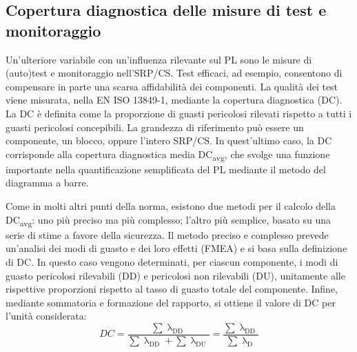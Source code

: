 \subsection{Copertura diagnostica delle misure di test e monitoraggio}
\label{subsec:06-2-14}
Un'ulteriore variabile con un'influenza rilevante sul PL sono le misure di (auto)test e monitoraggio nell'SRP/CS. Test efficaci, ad esempio, consentono di compensare in parte una scarsa affidabilità dei componenti. La qualità dei test viene misurata, nella EN ISO 13849-1, mediante la copertura diagnostica (DC). La DC è definita come la proporzione di guasti pericolosi rilevati rispetto a tutti i guasti pericolosi concepibili. La grandezza di riferimento può essere un componente, un blocco, oppure l'intero SRP/CS. In quest'ultimo caso, la DC corrisponde alla copertura diagnostica media DC\textsubscript{avg}, che svolge una funzione importante nella quantificazione semplificata del PL mediante il metodo del diagramma a barre.

Come in molti altri punti della norma, esistono due metodi per il calcolo della DC\textsubscript{avg}: uno più preciso ma più complesso; l'altro più semplice, basato su una serie di stime a favore della sicurezza. Il metodo preciso e complesso prevede un'analisi dei modi di guasto e dei loro effetti (FMEA) e si basa sulla definizione di DC. In questo caso vengono determinati, per ciascun componente, i modi di guasto pericolosi rilevabili (DD) e pericolosi non rilevabili (DU), unitamente alle rispettive proporzioni rispetto al tasso di guasto totale del componente. Infine, mediante sommatoria e formazione del rapporto, si ottiene il valore di DC per l'unità considerata:
\begin{equation}
    \textit{DC} = \frac{\displaystyle\sum \uplambda_{\mathrm{DD}}}{\displaystyle\sum \uplambda_{\mathrm{DD}} + \sum \uplambda_{\mathrm{DU}}}
    = \frac{\displaystyle\sum \uplambda_{\mathrm{DD}}}{\displaystyle\sum \uplambda_{\mathrm{D}}}
    \label{eq:06-03}
\end{equation}

